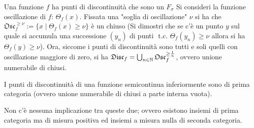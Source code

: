 \documentclass[a4paper,NoNotes]{stdmdoc}
\newcommand{\disc}{\mathfrak{Disc}}
\newcommand{\osc}{\mathfrak{Osc}}
\newcommand{\tc}{\mbox{ t.c. }}
\begin{document}
 Una funzione $f$ ha punti di discontinuità che sono un $F_\sigma$
\Dimostrazione Si consideri la funzione oscillazione di $f$: $\Theta_f(x)$. Fissata una "soglia di oscillazione" $\nu$ si ha che $\osc_f^{\ge \nu} := \{x \mid \Theta_f(x) \ge \nu\}$ è un chiuso (Si dimostri che se c'è un punto $y$ sul quale si accumula una successione $(y_n)$ di punti $\tc \Theta_f(y_n) \ge \nu$ allora si ha $\Theta_f(y) \ge \nu$). Ora, siccome i punti di discontinuità sono tutti e soli quelli con oscillazione maggiore di zero, si ha $\disc_f = \bigcup_{n\in\NN} \osc_f^{\ge \frac{1}{n}}$, ovvero unione numerabile di chiusi.

 I punti di discontinuità di una funzione semicontinua inferiormente sono di prima categoria (ovvero unione numerabile di chiusi a parte interna vuota).

 Non c'è nessuna implicazione tra queste due; ovvero esistono insiemi di prima categoria ma di misura positiva ed insiemi a misura nulla di seconda categoria.
\end{document}
